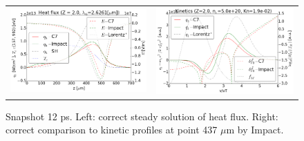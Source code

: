 \begin{figure}[tbh]
  \begin{center}
    \begin{tabular}{cc}
      \includegraphics[width=\figscale\textwidth]{../VFPdata/C7_Impact_case3_heatflux.png} &
      \includegraphics[width=\figscale\textwidth]{../VFPdata/C7_Impact_case3_kinetics.png}
    \end{tabular}
  \caption{  
  Snapshot 12 ps. Left: correct steady solution of heat flux. Right: correct comparison to kinetic profiles at point 437 $\mu$m by Impact.}
  \end{center}
  \label{fig:C7_Impact_case3}
\end{figure}


